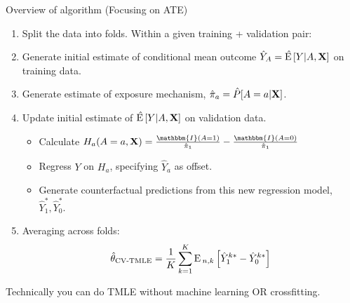 \documentclass[xcolor={table}]{beamer}
\begin{document}
\note{
\scriptsize \singlespacing

}
\begin{frame}{Overview of algorithm (Focusing on ATE)}

\begin{enumerate}
\item Split the data into folds. \pause Within a given training + validation pair:\pause
\item Generate initial estimate of conditional mean outcome $\hat Y_A = \hat {{\textrm E}\,} [Y | A, \mathbf{X} ]$ on training data. \pause 
\item Generate estimate of exposure mechanism, $\hat\pi_a = \hat P[A = a | \mathbf{X}]$. \pause
\item Update initial estimate of $\hat {{\textrm E}\,} [Y | A, \mathbf{X} ]$ on validation data.\pause
\begin{itemize}
\item Calculate $H_a(A = a, \X) = \frac{\mathbbm{I}(A = 1)}{\hat \pi_1} - \frac{\mathbbm{I}(A = 0)}{\hat \pi_1}$\pause
\item Regress $Y$ on $H_a$, specifying $\hat Y_a$ as offset. \pause
\item Generate counterfactual predictions from this new regression model, $\hat Y_1^*, \hat Y_0^*$. \pause
\end{itemize}
\item 
Averaging across folds:
\[
\hat{\theta}_{\textrm{CV-TMLE}} = \frac 1 K \sum_{k = 1}^K {\textrm E}\,_{n, k}\left[\hat Y_1^{k*} - \hat Y_0^{k*} \right]
\]
\end{enumerate}\pause

Technically you can do TMLE without machine learning OR crossfitting. 

\end{frame}
\end{document}
